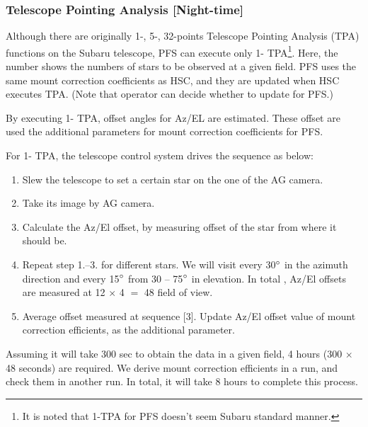 \subsubsection{Telescope Pointing Analysis [Night-time]}\label{secflow:TPA1}


Although there are originally 1-, 5-, 32-points Telescope Pointing Analysis (TPA) functions on the Subaru telescope, PFS can execute only 1- TPA\footnote{It is noted that 1-TPA for PFS doesn't seem Subaru standard manner.}.
Here, the number shows the numbers of stars to be observed at a given field.
PFS uses the same mount correction coefficients as HSC, and they are updated when HSC executes TPA.
(Note that operator can decide whether to update for PFS.)

By executing 1- TPA, offset angles for Az/EL are estimated.
These offset are used the additional parameters for mount correction coefficients for PFS.

For 1- TPA, the telescope control system drives the sequence as below:
\begin{enumerate}
\item Slew the telescope to set a certain star on the one of the AG camera.
\item Take its image by AG camera.
\item Calculate the Az/El offset, by measuring offset of the star from where it should be.
\item Repeat step 1.--3. for different stars.
We will visit every 30$^\circ$ in the azimuth direction and every 15$^\circ$ from 30 -- 75$^\circ$ in elevation.
In total , Az/El offsets are  measured at 12 $\times$ 4 $=$ 48 field of view.
\item Average offset measured at sequence [3].
Update Az/El offset value of mount correction efficients, as the additional parameter.
\end{enumerate}

Assuming it will take 300 sec to obtain the data in a given field, 4 hours (300 $\times$ 48 seconds) are required.
We derive mount correction efficients in a run, and check them in another run.
In total, it will take 8 hours to complete this process.

